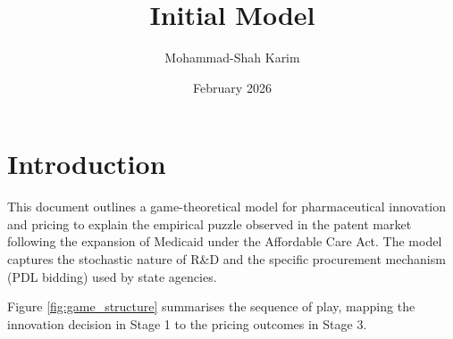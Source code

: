 \documentclass[12pt]{article}
\title{Initial Model}
\author{Mohammad-Shah Karim}
\date{February 2026}
\begin{document}
\maketitle

\tableofcontents

\newpage

\section{Introduction}

This document outlines a game-theoretical model for pharmaceutical innovation and pricing to explain the empirical puzzle observed in the patent market following the expansion of Medicaid under the Affordable Care Act. The model captures the stochastic nature of R\&D and the specific procurement mechanism (PDL bidding) used by state agencies.

Figure \ref{fig:game_structure} summarises the sequence of play, mapping the innovation decision in Stage 1 to the pricing outcomes in Stage 3.
\end{document}
